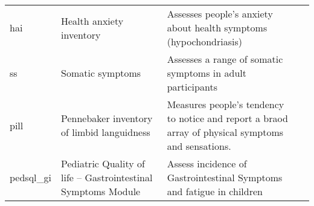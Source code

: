 \documentclass[]{book}
\begin{document}
\begin{longtable}[]{@{}llll@{}}
\begin{minipage}[t]{0.22\columnwidth}
hai\strut
\end{minipage} & \begin{minipage}[t]{0.27\columnwidth}\raggedright
Health anxiety inventory\strut
\end{minipage} & \begin{minipage}[t]{0.22\columnwidth}\raggedright
Assesses people's anxiety about health symptoms (hypochondriasis)\strut
\end{minipage} & \begin{minipage}[t]{0.18\columnwidth}\raggedright
\strut
\end{minipage}\tabularnewline
\begin{minipage}[t]{0.22\columnwidth}\raggedright
ss\strut
\end{minipage} & \begin{minipage}[t]{0.27\columnwidth}\raggedright
Somatic symptoms\strut
\end{minipage} & \begin{minipage}[t]{0.22\columnwidth}\raggedright
Assesses a range of somatic symptoms in adult participants\strut
\end{minipage} & \begin{minipage}[t]{0.18\columnwidth}\raggedright
\strut
\end{minipage}\tabularnewline
\begin{minipage}[t]{0.22\columnwidth}\raggedright
pill\strut
\end{minipage} & \begin{minipage}[t]{0.27\columnwidth}\raggedright
Pennebaker inventory of limbid languidness\strut
\end{minipage} & \begin{minipage}[t]{0.22\columnwidth}\raggedright
Measures people's tendency to notice and report a braod array of physical symptoms and sensations.\strut
\end{minipage} & \begin{minipage}[t]{0.18\columnwidth}\raggedright
\strut
\end{minipage}\tabularnewline
\begin{minipage}[t]{0.22\columnwidth}\raggedright
pedsql\_gi\strut
\end{minipage} & \begin{minipage}[t]{0.27\columnwidth}\raggedright
Pediatric Quality of life -- Gastrointestinal Symptoms Module\strut
\end{minipage} & \begin{minipage}[t]{0.22\columnwidth}\raggedright
Assess incidence of Gastrointestinal Symptoms and fatigue in children\strut

\end{minipage}
\end{longtable}
\end{document}
